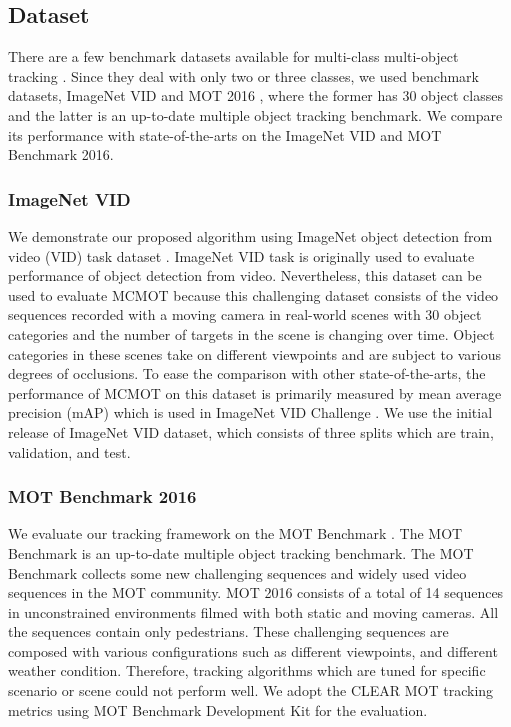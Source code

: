 \documentclass[runningheads]{llncs}
\begin{document}
\subsection{Dataset}

There are a few benchmark datasets available for multi-class multi-object tracking \cite{Ref43}. Since they deal with only two or three classes, we used benchmark datasets, ImageNet VID \cite{Ref31} and MOT 2016 \cite{Ref32}, where the former has 30 object classes and the latter is an up-to-date multiple object tracking benchmark. We compare its performance with state-of-the-arts on the ImageNet VID and MOT Benchmark 2016.

\subsubsection{ImageNet VID}

We demonstrate our proposed algorithm using ImageNet object detection from video (VID) task dataset \cite{Ref31}. ImageNet VID task is originally used to evaluate performance of object detection from video. Nevertheless, this dataset can be used to evaluate MCMOT because this challenging dataset consists of the video sequences recorded with a moving camera in real-world scenes with 30 object categories and the number of targets in the scene is changing over time. Object categories in these scenes take on different viewpoints and are subject to various degrees of occlusions. To ease the comparison with other state-of-the-arts, the performance of MCMOT on this dataset is primarily measured by mean average precision (mAP) which is used in ImageNet VID Challenge \cite{Ref31}. We use the initial release of ImageNet VID dataset, which consists of three splits which are train, validation, and test.

\subsubsection{MOT Benchmark 2016}

We evaluate our tracking framework on the MOT Benchmark \cite{Ref32}. The MOT Benchmark is an up-to-date multiple object tracking benchmark. The MOT Benchmark collects some new challenging sequences and widely used video sequences in the MOT community. MOT 2016 consists of a total of 14 sequences in unconstrained environments filmed with both static and moving cameras. All the sequences contain only pedestrians. These challenging sequences are composed with various configurations such as different viewpoints, and different weather condition. Therefore, tracking algorithms which are tuned for specific scenario or scene could not perform well. We adopt the CLEAR MOT tracking metrics \cite{Ref23} using MOT Benchmark Development Kit \cite{Ref32} for the evaluation.
\end{document}

